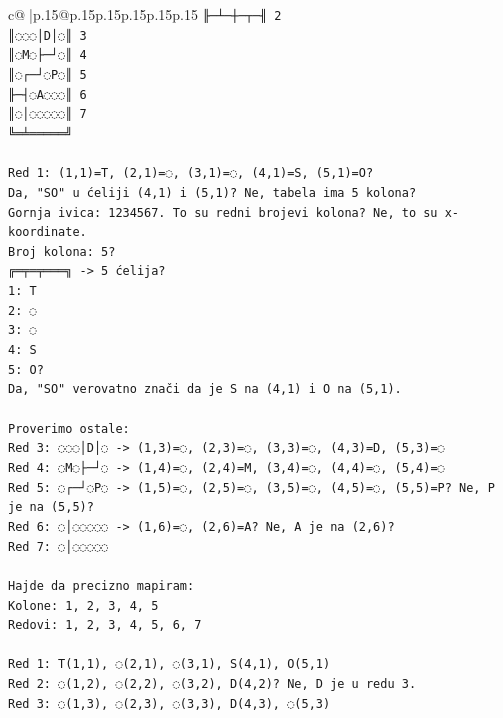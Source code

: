 \documentclass{article}
\begin{document}
{\begin{supertabular}{c@{$\;$}|p{.15\linewidth}@{}p{.15\linewidth}p{.15\linewidth}p{.15\linewidth}p{.15\linewidth}p{.15\linewidth}}
{{{\texttt{╟─┴─┼─┬─╢ 2} \\
\texttt{║◌◌◌│D│◌║ 3} \\
\texttt{║◌M◌├─┘◌║ 4} \\
\texttt{║◌┌─┘◌P◌║ 5} \\
\texttt{╟─┤◌A◌◌◌║ 6} \\
\texttt{║◌│◌◌◌◌◌║ 7} \\
\texttt{╚═╧═════╝} \\
\\ 
\texttt{Red 1: (1,1)=T, (2,1)=◌, (3,1)=◌, (4,1)=S, (5,1)=O?} \\
\texttt{Da, "SO" u ćeliji (4,1) i (5,1)? Ne, tabela ima 5 kolona?} \\
\texttt{Gornja ivica: 1234567. To su redni brojevi kolona? Ne, to su x{-}koordinate.} \\
\texttt{Broj kolona: 5?} \\
\texttt{╔═╤═╤═══╗ {-}> 5 ćelija?} \\
\texttt{1: T} \\
\texttt{2: ◌} \\
\texttt{3: ◌} \\
\texttt{4: S} \\
\texttt{5: O?} \\
\texttt{Da, "SO" verovatno znači da je S na (4,1) i O na (5,1).} \\
\\ 
\texttt{Proverimo ostale:} \\
\texttt{Red 3: ◌◌◌│D│◌ {-}> (1,3)=◌, (2,3)=◌, (3,3)=◌, (4,3)=D, (5,3)=◌} \\
\texttt{Red 4: ◌M◌├─┘◌ {-}> (1,4)=◌, (2,4)=M, (3,4)=◌, (4,4)=◌, (5,4)=◌} \\
\texttt{Red 5: ◌┌─┘◌P◌ {-}> (1,5)=◌, (2,5)=◌, (3,5)=◌, (4,5)=◌, (5,5)=P? Ne, P je na (5,5)?} \\
\texttt{Red 6: ◌│◌◌◌◌◌ {-}> (1,6)=◌, (2,6)=A? Ne, A je na (2,6)?} \\
\texttt{Red 7: ◌│◌◌◌◌◌} \\
\\ 
\texttt{Hajde da precizno mapiram:} \\
\texttt{Kolone: 1, 2, 3, 4, 5} \\
\texttt{Redovi: 1, 2, 3, 4, 5, 6, 7} \\
\\ 
\texttt{Red 1: T(1,1), ◌(2,1), ◌(3,1), S(4,1), O(5,1)} \\
\texttt{Red 2: ◌(1,2), ◌(2,2), ◌(3,2), D(4,2)? Ne, D je u redu 3.} \\
\texttt{Red 3: ◌(1,3), ◌(2,3), ◌(3,3), D(4,3), ◌(5,3)} \\
}}}
\end{supertabular}}
\end{document}
